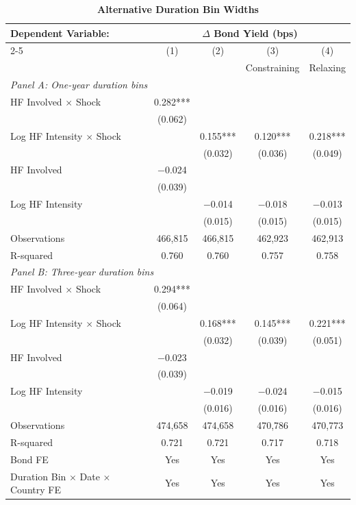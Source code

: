 \documentclass[english, 11pt, oneside]{article}
\begin{document}
\begin{table}[h!]
\centering
\caption{\textbf{Alternative Duration Bin Widths}}
\footnotesize
\setlength{\tabcolsep}{8pt}
\renewcommand{\arraystretch}{1.1}
\begin{tabular}{l c c c c}
\toprule
\textbf{Dependent Variable:} & \multicolumn{4}{c}{\textbf{$\Delta$ Bond Yield (bps)}} \\
\cmidrule(lr){2-5}
 & (1) & (2) & (3) & (4) \\
 & & & Constraining & Relaxing \\
\midrule
\multicolumn{5}{l}{\textit{Panel A: One-year duration bins}} \\
\addlinespace
HF Involved $\times$ Shock & 0.282*** & & & \\
 & (0.062) & & & \\
Log HF Intensity $\times$ Shock & & 0.155*** & 0.120*** & 0.218*** \\
 & & (0.032) & (0.036) & (0.049) \\
HF Involved & $-$0.024 & & & \\
 & (0.039) & & & \\
Log HF Intensity & & $-$0.014 & $-$0.018 & $-$0.013 \\
 & & (0.015) & (0.015) & (0.015) \\
Observations & 466,815 & 466,815 & 462,923 & 462,913 \\
R-squared & 0.760 & 0.760 & 0.757 & 0.758 \\
\midrule
\multicolumn{5}{l}{\textit{Panel B: Three-year duration bins}} \\
\addlinespace
HF Involved $\times$ Shock & 0.294*** & & & \\
 & (0.064) & & & \\
Log HF Intensity $\times$ Shock & & 0.168*** & 0.145*** & 0.221*** \\
 & & (0.032) & (0.039) & (0.051) \\
HF Involved & $-$0.023 & & & \\
 & (0.039) & & & \\
Log HF Intensity & & $-$0.019 & $-$0.024 & $-$0.015 \\
 & & (0.016) & (0.016) & (0.016) \\
Observations & 474,658 & 474,658 & 470,786 & 470,773 \\
R-squared & 0.721 & 0.721 & 0.717 & 0.718 \\
\midrule
Bond FE & Yes & Yes & Yes & Yes \\
Duration Bin $\times$ Date $\times$ Country FE & Yes & Yes & Yes & Yes \\

\end{tabular}
\end{table}
\end{document}
